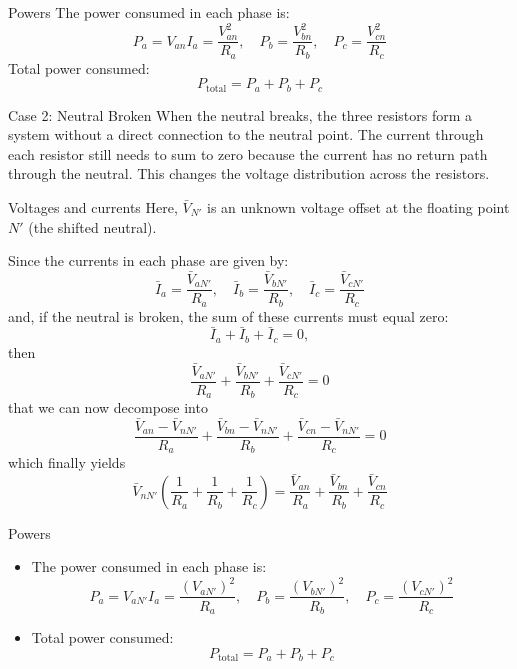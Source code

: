 \begin{frame}{Powers}
    The power consumed in each phase is:
    $$P_a = V_{an} I_a = \frac{V_{an}^2}{R_a}, \quad P_b = \frac{V_{bn}^2}{R_b}, \quad P_c = \frac{V_{cn}^2}{R_c}$$
    Total power consumed:
    $$P_{\text{total}} = P_a + P_b + P_c$$
\end{frame}

\begin{frame}{Case 2: Neutral Broken}
    When the neutral breaks, the three resistors form a system without a direct connection to the neutral point. The current through each resistor still needs to sum to zero because the current has no return path through the neutral. This changes the voltage distribution across the resistors.
\end{frame}

\begin{frame}[allowframebreaks]{Voltages and currents}
    Here, $\bar{V}_{N'} $ is an unknown voltage offset at the floating point $N'$ (the shifted neutral). 
    
    Since the currents in each phase are given by:
    $$
    \bar{I}_a = \frac{\bar{V}_{aN'}}{R_a}, \quad \bar{I}_b = \frac{\bar{V}_{bN'}}{R_b}, \quad \bar{I}_c = \frac{\bar{V}_{cN'}}{R_c}
    $$
    and, if the neutral is broken, the sum of these currents must equal zero:
    $$
    \bar{I}_a + \bar{I}_b + \bar{I}_c = 0,
    $$
    then 
    \begin{equation}
    \frac{\bar{V}_{aN'}}{R_a} + \frac{\bar{V}_{bN'}}{R_b} + \frac{\bar{V}_{cN'}}{R_c} = 0 \label{eq:neutral_break_KCL}    
    \end{equation}
    that we can now decompose into
    $$
    \frac{\bar{V}_{an}-\bar{V}_{nN'}}{R_a} + \frac{\bar{V}_{bn}-\bar{V}_{nN'}}{R_b} + \frac{\bar{V}_{cn}-\bar{V}_{nN'}}{R_c} = 0    
    $$
    which finally yields
    $$
    \bar{V}_{nN'} \left(\frac{1}{R_a}+\frac{1}{R_b}+\frac{1}{R_c}\right) =     \frac{\bar{V}_{an}}{R_a} + \frac{\bar{V}_{bn}}{R_b} + \frac{\bar{V}_{cn}}{R_c} 
    $$

\end{frame}

\begin{frame}{Powers}
    \begin{itemize}
        \item The power consumed in each phase is:
        $$
        P_a = V_{aN'} I_a = \frac{(V_{aN'})^2}{R_a}, \quad P_b = \frac{(V_{bN'})^2}{R_b}, \quad P_c = \frac{(V_{cN'})^2}{R_c}
        $$
        \item Total power consumed:
        $$
        P_{\text{total}} = P_a + P_b + P_c
        $$
    \end{itemize}
\end{frame}

